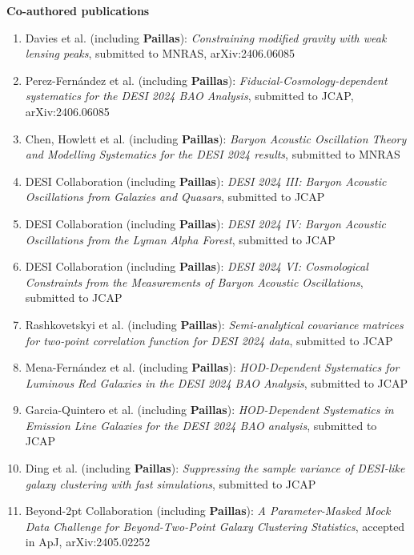 \documentclass[12pt, a4paper]{article} %
\begin{document}
\textbf{Co-authored publications}
\begin{flushleft}%
  \setlength{\leftskip}{0.2cm}%
\begin{enumerate}
\setlength\itemsep{0.05cm}

\item[20.] Davies et al. (including \textbf{Paillas}): \textit{Constraining modified gravity with weak lensing peaks}, submitted to MNRAS, arXiv:2406.06085
\item[19.] Perez-Fern\'andez et al. (including \textbf{Paillas}): \textit{Fiducial-Cosmology-dependent systematics for the DESI 2024 BAO Analysis}, submitted to JCAP, arXiv:2406.06085
\item[18.] Chen, Howlett et al. (including \textbf{Paillas}): \textit{Baryon Acoustic Oscillation Theory and Modelling Systematics for the DESI 2024 results}, submitted to MNRAS
\item[17.] DESI Collaboration (including \textbf{Paillas}): \textit{DESI 2024 III: Baryon Acoustic Oscillations from Galaxies and Quasars}, submitted to JCAP
\item[16.] DESI Collaboration (including \textbf{Paillas}): \textit{DESI 2024 IV: Baryon Acoustic Oscillations from the Lyman Alpha Forest}, submitted to JCAP
\item[15.] DESI Collaboration (including \textbf{Paillas}): \textit{DESI 2024 VI: Cosmological Constraints from the Measurements of Baryon Acoustic Oscillations}, submitted to JCAP
\item[14.] Rashkovetskyi et al. (including \textbf{Paillas}): \textit{Semi-analytical covariance matrices for two-point correlation function for DESI 2024 data}, submitted to JCAP
\item[13.] Mena-Fern\'andez et al. (including \textbf{Paillas}): \textit{HOD-Dependent Systematics for Luminous Red Galaxies in the DESI 2024 BAO Analysis}, submitted to JCAP
\item[12.] Garcia-Quintero et al. (including \textbf{Paillas}): \textit{HOD-Dependent Systematics in Emission Line Galaxies for the DESI 2024 BAO analysis}, submitted to JCAP

\item[11.] Ding et al. (including \textbf{Paillas}): \textit{Suppressing the sample variance of DESI-like galaxy clustering with fast simulations}, submitted to JCAP

\item[10.] Beyond-2pt Collaboration (including \textbf{Paillas}): \textit{A Parameter-Masked Mock Data Challenge for Beyond-Two-Point Galaxy Clustering Statistics}, accepted in ApJ, arXiv:2405.02252


\end{enumerate}
\end{flushleft}
\end{document}
